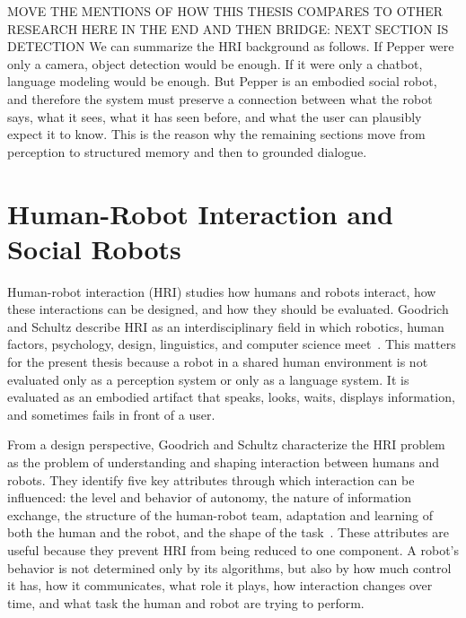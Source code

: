 MOVE THE MENTIONS OF HOW THIS THESIS COMPARES TO OTHER RESEARCH HERE IN THE END AND THEN BRIDGE: NEXT SECTION IS DETECTION
We can summarize the HRI background as follows. If Pepper were only a camera, object detection would be enough. If it were only a chatbot, language modeling would be enough. But Pepper is an embodied social robot, and therefore the system must preserve a connection between what the robot says, what it sees, what it has seen before, and what the user can plausibly expect it to know. This is the reason why the remaining sections move from perception to structured memory and then to grounded dialogue.


\section{Human-Robot Interaction and Social Robots}\label{sec:hri-social-robots}

  Human-robot interaction (HRI) studies how humans and robots interact, how these interactions can be designed, and how they should be evaluated. Goodrich and Schultz describe HRI as an interdisciplinary
  field in which robotics, human factors, psychology, design, linguistics, and computer science meet~\cite[203--216]{goodrich_human-robot_2007}. This matters for the present thesis because a robot in a
  shared human environment is not evaluated only as a perception system or only as a language system. It is evaluated as an embodied artifact that speaks, looks, waits, displays information, and
  sometimes fails in front of a user.

  From a design perspective, Goodrich and Schultz characterize the HRI problem as the problem of understanding and shaping interaction between humans and robots. They identify five key attributes through
  which interaction can be influenced: the level and behavior of autonomy, the nature of information exchange, the structure of the human-robot team, adaptation and learning of both the human and the
  robot, and the shape of the task~\cite[216--217]{goodrich_human-robot_2007}. These attributes are useful because they prevent HRI from being reduced to one component. A robot's behavior is not
  determined only by its algorithms, but also by how much control it has, how it communicates, what role it plays, how interaction changes over time, and what task the human and robot are trying to
  perform.

